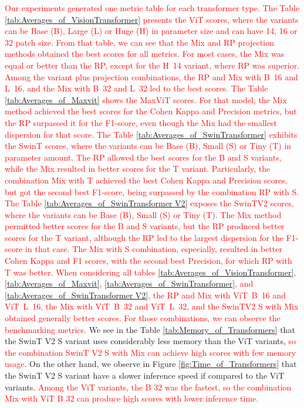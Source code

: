 \textcolor{red}{
Our experiments generated one metric table for each transformer type. 
The Table \ref{tab:Averages_of_VisionTransformer} presents the \gls{ViT} scores, where the variants can be Base (B), Large (L) or Huge (H) in parameter size and can have 14, 16 or 32 patch size. From that table, we can see that the \gls{Mix} and \gls{RP} projection methods obtained the best scores for all metrics. For most cases, the \gls{Mix} was equal or better than the \gls{RP}, except for the \mbox{H 14} variant, where \gls{RP} was superior. Among the variant plus projection combinations, the \gls{RP} and \gls{Mix} with \mbox{B 16} and \mbox{L 16}, and the \gls{Mix} with \mbox{B 32} and \mbox{L 32} led to the best scores. 
The Table \ref{tab:Averages_of_Maxvit} shows the \gls{MaxViT} scores. For that model, the \gls{Mix} method achieved the best scores for the Cohen Kappa and Precision metrics, but the \gls{RP} surpassed it for the F1-score, even though the \gls{Mix} had the smallest dispersion for that score.  
The Table \ref{tab:Averages_of_SwinTransformer} exhibits the \gls{SwinT} scores, where the variants can be Base (B), Small (S) or Tiny (T) in parameter amount. The \gls{RP} allowed the best scores for the B and S variants, while the \gls{Mix} resulted in better scores for the T variant. Particularly, the combination \gls{Mix} with T achieved the best Cohen Kappa and Precision scores, but got the second best F1-score, being surpassed by the combination \gls{RP} with S.
The Table \ref{tab:Averages_of_SwinTransformer V2} exposes the \gls{SwinTV2} scores, where the variants can be Base (B), Small (S) or Tiny (T). The \gls{Mix} method permitted better scores for the B and S variants, but the \gls{RP} produced better scores for the T variant, although the \gls{RP} led to the largest dispersion for the F1-score in that case. The \gls{Mix} with S combination, especially, resulted in better Cohen Kappa and F1 scores, with the second best Precision, for which \gls{RP} with T was better.
When considering all tables \ref{tab:Averages_of_VisionTransformer}, \ref{tab:Averages_of_Maxvit}, \ref{tab:Averages_of_SwinTransformer}, and \ref{tab:Averages_of_SwinTransformer V2}, the \gls{RP} and \gls{Mix} with \mbox{\gls{ViT} B 16} and \mbox{\gls{ViT} L 16}, the \gls{Mix} with \mbox{\gls{ViT} B 32} and \mbox{\gls{ViT} L 32}, and the \gls{SwinTV2} S with \gls{Mix} obtained generally better scores. For those combinations, we can observe the benchmarking metrics.
}
We see in the Table \ref{tab:Memory_of_Transformers} that the \gls{SwinT} V2 S variant uses considerably less memory than the \gls{ViT} variants, \textcolor{red}{so the combination \gls{SwinT} V2 S with \gls{Mix} can achieve high scores with few memory usage}. On the other hand, we observe in Figure \ref{fig:Time_of_Transformers} that the \gls{SwinT} V2 S variant have a slower inference speed if compared to the \gls{ViT} variants. \textcolor{red}{ Among the \gls{ViT} variants, the B 32 was the fastest, so the combination \gls{Mix} with \gls{ViT} B 32 can produce high scores with lower inference time.}

